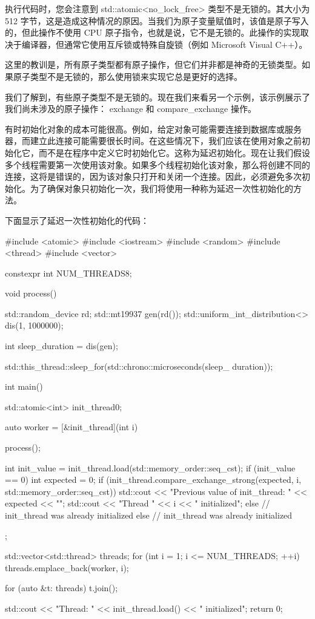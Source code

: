 执行代码时，您会注意到 std::atomic<no\_lock\_free> 类型不是无锁的。其大小为 512 字节，这是造成这种情况的原因。当我们为原子变量赋值时，该值是原子写入的，但此操作不使用 CPU 原子指令，也就是说，它不是无锁的。此操作的实现取决于编译器，但通常它使用互斥锁或特殊自旋锁（例如 Microsoft Visual C++）。

这里的教训是，所有原子类型都有原子操作，但它们并非都是神奇的无锁类型。如果原子类型不是无锁的，那么使用锁来实现它总是更好的选择。

我们了解到，有些原子类型不是无锁的。现在我们来看另一个示例，该示例展示了我们尚未涉及的原子操作： exchange 和 compare\_exchange 操作。


有时初始化对象的成本可能很高。例如，给定对象可能需要连接到数据库或服务器，而建立此连接可能需要很长时间。在这些情况下，我们应该在使用对象之前初始化它，而不是在程序中定义它时初始化它。这称为延迟初始化。现在让我们假设多个线程需要第一次使用该对象。如果多个线程初始化该对象，那么将创建不同的连接，这将是错误的，因为该对象只打开和关闭一个连接。因此，必须避免多次初始化。为了确保对象只初始化一次，我们将使用一种称为延迟一次性初始化的方法。

下面显示了延迟一次性初始化的代码：

\begin{cpp}
#include <atomic>
#include <iostream>
#include <random>
#include <thread>
#include <vector>

constexpr int NUM_THREADS{8};

void process() {
    std::random_device rd;
    std::mt19937 gen(rd());
    std::uniform_int_distribution<> dis(1, 1000000);

    int sleep_duration = dis(gen);

    std::this_thread::sleep_for(std::chrono::microseconds(sleep_
    duration));
}

int main() {
    std::atomic<int> init_thread{0};

    auto worker = [&init_thread](int i) {
        process();

        int init_value = init_thread.load(std::memory_order::seq_cst);
        if (init_value == 0) {
            int expected = 0;
            if (init_thread.compare_exchange_strong(expected, i,
            std::memory_order::seq_cst)) {
                std::cout << "Previous value of init_thread: " <<
                expected << "\n";
                std::cout << "Thread " << i << " initialized\n";
            } else {
                // init_thread was already initialized
            }
        } else {
            // init_thread was already initialized
        }
    };

    std::vector<std::thread> threads;
    for (int i = 1; i <= NUM_THREADS; ++i) {
        threads.emplace_back(worker, i);
    }

    for (auto &t: threads) {
        t.join();
    }

    std::cout << "Thread: " << init_thread.load() << " initialized\n";
    return 0;
}
\end{cpp}

